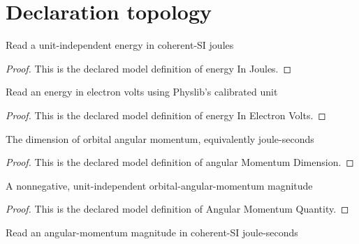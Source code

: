 \section{Declaration topology}
\begin{definition}
  \label{def:physics:phyx-mini-0620:phyxminiproblems-problemphyxmini0620-energyinjoules}
  Read a unit-independent energy in coherent-SI joules
\end{definition}
\begin{proof}
  This is the declared model definition of energy In Joules.
\end{proof}
\begin{definition}
  \label{def:physics:phyx-mini-0620:phyxminiproblems-problemphyxmini0620-energyinelectronvolts}
  Read an energy in electron volts using Physlib's calibrated unit
\end{definition}
\begin{proof}
  This is the declared model definition of energy In Electron Volts.
\end{proof}
\begin{definition}
  \label{def:physics:phyx-mini-0620:phyxminiproblems-problemphyxmini0620-angularmomentumdimension}
  The dimension of orbital angular momentum, equivalently joule-seconds
\end{definition}
\begin{proof}
  This is the declared model definition of angular Momentum Dimension.
\end{proof}
\begin{definition}
  \label{def:physics:phyx-mini-0620:phyxminiproblems-problemphyxmini0620-angularmomentumquantity}
  A nonnegative, unit-independent orbital-angular-momentum magnitude
\end{definition}
\begin{proof}
  This is the declared model definition of Angular Momentum Quantity.
\end{proof}
\begin{definition}
  \label{def:physics:phyx-mini-0620:phyxminiproblems-problemphyxmini0620-angularmomentuminjouleseconds}
  Read an angular-momentum magnitude in coherent-SI joule-seconds
\end{definition}
